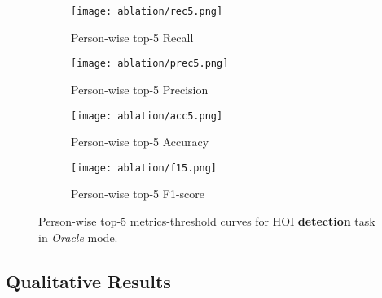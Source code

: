 \documentclass[times,twocolumn,final,authoryear]{elsarticle}
\begin{document}
\begin{figure*}
    \centering
    \begin{subfigure}[]{0.24\textwidth}
        \texttt{[image: ablation/rec5.png]}
        \caption{Person-wise top-5 Recall}
    \end{subfigure}
    \begin{subfigure}[]{0.24\textwidth}
        \texttt{[image: ablation/prec5.png]}
        \caption{Person-wise top-5 Precision}
    \end{subfigure}
    \begin{subfigure}[]{0.24\textwidth}
        \texttt{[image: ablation/acc5.png]}
        \caption{Person-wise top-5 Accuracy}
    \end{subfigure}
    \begin{subfigure}[]{0.24\textwidth}
        \texttt{[image: ablation/f15.png]}
        \caption{Person-wise top-5 F1-score}
    \end{subfigure}

    \caption{Person-wise top-$5$ metrics-threshold curves for HOI \textbf{detection} task in \textit{Oracle} mode. }
    \label{fig:ablation_thres}
\end{figure*}

\subsection{Qualitative Results}
\end{document}
